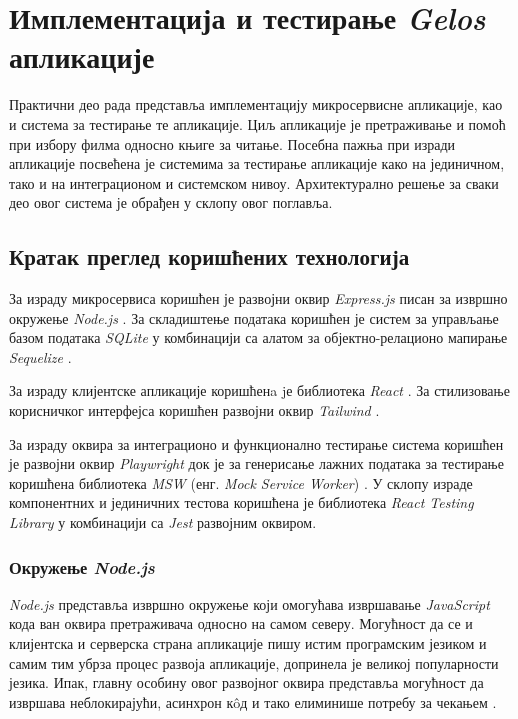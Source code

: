 \documentclass[12pt,oneside]{memoir}
\begin{document}
\chapter{Имплементација и тестирање \textit{Gelos} апликације}
\label{chp:aplikacija}
Практични део рада представља имплементацију микросервисне апликације, као и система за тестирање те апликације. Циљ апликације је претраживање и помоћ при избору филма односно књиге за читање. Посебна пажња при изради апликације посвећена је системима за тестирање апликације како на јединичном, тако и на интеграционом и системском нивоу. Архитектурално решење за сваки део овог система је обрађен у склопу овог поглавља.

\section{Кратак преглед коришћених технологија}
\label{chp:tehnologije}

За израду микросервиса коришћен је развојни оквир \textit{Express.js} \cite{express} писан за извршно окружење \textit{Node.js} \cite{nodejs}. За складиштење података коришћен је систем за управљање базом података \textit{SQLite} \cite{sqlite} у комбинацији са алатом за објектно-релационо мапирање \textit{Sequelize} \cite{sequelize}. 

За израду клијентске апликације коришћенa jе библиотека \textit{React} \cite{react}. За стилизовање корисничког интерфејса коришћен развојни оквир \textit{Tailwind} \cite{tailwind}. 

За израду оквира за интеграционо и функционално тестирање система коришћен је развојни оквир \textit{Playwright} \cite{playwright} док је за генерисање лажних података за тестирање коришћена библиотека \textit{MSW} (енг. \textit{Mock Service Worker}) \cite{msw}. У склопу израде компонентних и јединичних тестова коришћена је библиотека \textit{React Testing Library} \cite{rtl} у комбинацији са \textit{Jest} \cite{jest} развојним оквиром.

\subsection{Окружење \textit{Node.js}}

\textit{Node.js} представља извршно окружење који омогућава извршавање \textit{JavaScript} кода ван оквира претраживача односно на самом северу. Могућност да се и клијентска и серверска страна апликације пишу истим програмским језиком и самим тим убрза процес развоја апликације, допринела је великој популарности језика.
Ипак, главну особину овог развојног оквира представља могућност да извршава неблокирајући, асинхрон к\^{o}д и тако елиминише потребу за чекањем  \cite{w3nodejs}.
\end{document}
